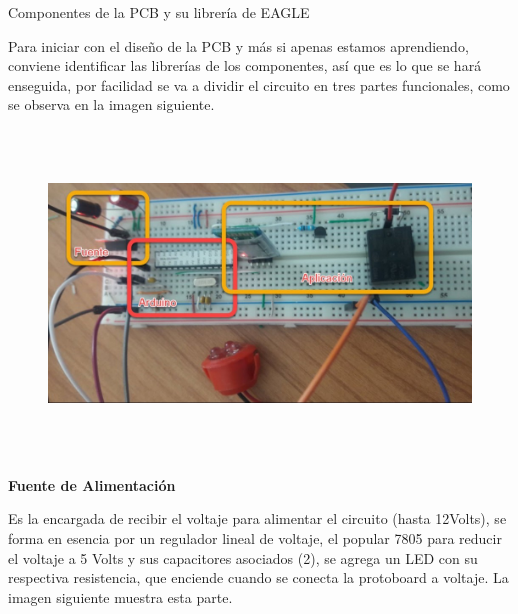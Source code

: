 \documentclass[12pt]{article}
\begin{document}
{\fontsize{14pt}{16.8pt}\selectfont Componentes de la PCB y su librería de EAGLE\par}\par

Para iniciar con el diseño de la PCB y más si apenas estamos aprendiendo, conviene identificar las librerías de los componentes, así que es lo que se hará enseguida, por facilidad se va a dividir el circuito en tres partes funcionales, como se observa en la imagen siguiente.\par




\begin{figure}[H]
	\begin{Center}
		\includegraphics[width=6.61in,height=3.42in]{./media/image13.jpeg}
	\end{Center}
\end{figure}



\par

{\fontsize{14pt}{16.8pt}\selectfont \textbf{Fuente de Alimentación}\par}\par

Es la encargada de recibir el voltaje para alimentar el circuito (hasta 12Volts), se forma en esencia por un regulador lineal de voltaje, el popular 7805 para reducir el voltaje a 5 Volts y sus capacitores asociados (2), se agrega un LED con su respectiva resistencia, que enciende cuando se conecta la protoboard a voltaje. La imagen siguiente muestra esta parte.\par
\end{document}
